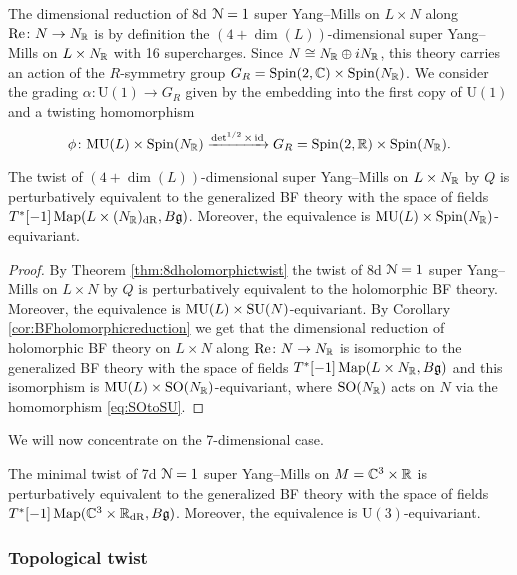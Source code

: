\documentclass[10pt, oneside]{article}
\newcommand{\MU}{\mathrm{MU}}
\renewcommand{\Re}{\mathrm{Re}}
\renewcommand{\U}{\mathrm{U}}
\begin{document}
The dimensional reduction of 8d $\mathcal N=1$ super Yang--Mills on $L\times N$ along $\Re\colon N\rightarrow N_\RR$ is by definition the $(4+\dim(L))$-dimensional super Yang--Mills on $L\times N_\mathbb R$ with 16 supercharges. Since $N\cong N_\mathbb R\oplus iN_\mathbb R$, this theory carries an action of the $R$-symmetry group $G_R=\mathrm{Spin}(2, \mathbb C)\times \mathrm{Spin}(N_\mathbb R)$. We consider the grading $\alpha\colon \U(1)\rightarrow G_R$ given by the embedding into the first copy of $\U(1)$ and a twisting homomorphism
\[\phi\colon \MU(L)\times \Spin(N_\RR)\xrightarrow{\det^{1/2}\times \id} G_R=\Spin(2, \RR)\times \Spin(N_\RR).\]

\begin{theorem}
The twist of $(4+\dim(L))$-dimensional super Yang--Mills on $L\times N_\mathbb R$ by $Q$ is perturbatively equivalent to the generalized BF theory with the space of fields $T^*[-1] \operatorname{Map}(L\times (N_\mathbb R)_{\mathrm{dR}}, B\mathfrak g)$. Moreover, the equivalence is $\MU(L)\times \Spin(N_\RR)$-equivariant.
\label{thm:8dBFreduction}
\end{theorem}
\begin{proof}
By Theorem \ref{thm:8dholomorphictwist} the twist of 8d $\mathcal N=1$ super Yang--Mills on $L\times N$ by $Q$ is perturbatively equivalent to the holomorphic BF theory. Moreover, the equivalence is $\MU(L)\times \SU(N)$-equivariant. By Corollary \ref{cor:BFholomorphicreduction} we get that the dimensional reduction of holomorphic BF theory on $L\times N$ along $\Re\colon N\rightarrow N_\RR$ is isomorphic to the generalized BF theory with the space of fields $T^*[-1]\operatorname{Map}(L\times N_\mathbb R, B\mathfrak g)$ and this isomorphism is $\MU(L)\times \SO(N_\RR)$-equivariant, where $\mathrm{SO}(N_\mathbb R)$ acts on $N$ via the homomorphism \eqref{eq:SOtoSU}.
\end{proof}

We will now concentrate on the 7-dimensional case.

\begin{theorem}
The minimal twist of 7d $\mathcal N=1$ super Yang--Mills on $M=\mathbb C^3\times \mathbb R$ is perturbatively equivalent to the generalized BF theory with the space of fields $T^*[-1]\operatorname{Map}(\mathbb C^3\times \mathbb R_{\mathrm{dR}}, B\mathfrak g)$. Moreover, the equivalence is $\U(3)$-equivariant.
\label{thm:7dminimaltwist}
\end{theorem}

\subsubsection{Topological twist}
\label{sect:7dtopologicaltwist}
\end{document}

